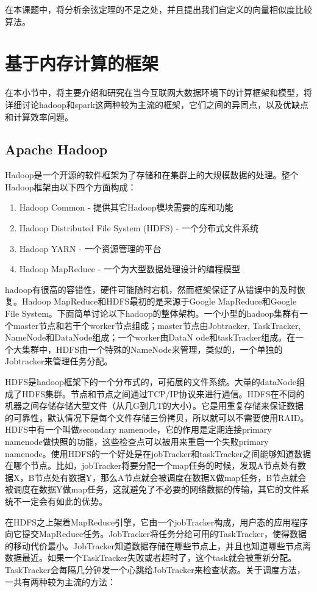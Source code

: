 在本课题中，将分析余弦定理的不足之处，并且提出我们自定义的向量相似度比较算法。

\section{基于内存计算的框架}
\label{sec:framework}
在本小节中，将主要介绍和研究在当今互联网大数据环境下的计算框架和模型，将详细讨论hadoop和spark这两种较为主流的框架，它们之间的异同点，以及优缺点和计算效率问题。

\subsection{Apache Hadoop}
Hadoop是一个开源的软件框架为了存储和在集群上的大规模数据的处理。整个Hadoop框架由以下四个方面构成：

\begin{enumerate}
\item Hadoop Common - 提供其它Hadoop模块需要的库和功能
\item Hadoop Distributed File System (HDFS) - 一个分布式文件系统
\item Hadoop YARN - 一个资源管理的平台
\item Hadoop MapReduce - 一个为大型数据处理设计的编程模型
\end{enumerate}
hadoop有很高的容错性，硬件可能随时宕机，然而框架保证了从错误中的及时恢复。Hadoop MapReduce和HDFS最初的是来源于Google MapReduce和Google File System。下面简单讨论以下hadoop的整体架构。一个小型的hadoop集群有一个master节点和若干个worker节点组成；master节点由Jobtracker, TaskTracker, NameNode和DataNode组成；一个worker由DataN
ode和taskTracker组成。在一个大集群中，HDFS由一个特殊的NameNode来管理，类似的，一个单独的Jobtracker来管理任务分配。

HDFS是hadoop框架下的一个分布式的，可拓展的文件系统。大量的dataNode组成了HDFS集群。节点和节点之间通过TCP/IP协议来进行通信。HDFS在不同的机器之间存储存储大型文件（从几G到几T的大小）。它是用重复存储来保证数据的可靠性，默认情况下是每个文件存储三份拷贝，所以就可以不需要使用RAID。HDFS中有一个叫做secondary namenode，它的作用是定期连接primary namenode做快照的功能，这些检查点可以被用来重启一个失败primary namenode。使用HDFS的一个好处是在jobTracker和taskTracker之间能够知道数据在哪个节点。比如，jobTracker将要分配一个map任务的时候，发现A节点处有数据X，B节点处有数据Y，那么A节点就会被调度在数据X做map任务，B节点就会被调度在数据Y做map任务，这就避免了不必要的网络数据的传输，其它的文件系统不一定会有如此的优势。

在HDFS之上架着MapReduce引擎，它由一个jobTracker构成，用户态的应用程序向它提交MapReduce任务。JobTracker将任务分给可用的TaskTracker，使得数据的移动代价最小。JobTracker知道数据存储在哪些节点上，并且也知道哪些节点离数据最近。如果一个TaskTracker失败或者超时了，这个task就会被重新分配。TaskTracker会每隔几分钟发一个心跳给JobTracker来检查状态。关于调度方法，一共有两种较为主流的方法：

